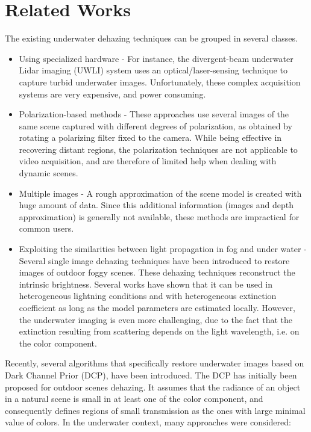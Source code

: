 \documentclass[hidelinks, 12pt]{report}
\begin{document}
\section{Related Works}
\justify
The existing underwater dehazing techniques can be grouped in several classes. 
\begin{itemize}
\item{Using specialized hardware - For instance, the divergent-beam underwater Lidar imaging (UWLI) system uses an optical/laser-sensing technique to capture turbid underwater images. Unfortunately, these complex acquisition systems are very expensive, and power consuming.}
\item{Polarization-based methods - These approaches use several images of the same scene captured with different degrees of polarization, as obtained by rotating a polarizing filter fixed to the camera. While being effective in recovering distant regions, the polarization techniques are not applicable to video acquisition, and are therefore of limited help when dealing with dynamic scenes.}
\item{Multiple images - A rough approximation of the scene model is created with huge amount of data. Since this additional information (images and depth approximation) is generally not available, these methods are impractical for common users.}
\item{Exploiting the similarities between light propagation in fog and under water - Several single image dehazing techniques have been introduced to restore images of outdoor foggy scenes. These dehazing techniques reconstruct the intrinsic brightness. Several works have shown that it can be used in heterogeneous lightning conditions and with heterogeneous extinction coefficient as long as the model parameters are estimated locally. However, the underwater imaging is even more challenging, due to the fact that the extinction resulting from scattering depends on the light wavelength, i.e. on the color component.}
\end{itemize}
Recently, several algorithms that specifically restore underwater images based on Dark Channel Prior (DCP), have been introduced. The DCP has initially been proposed for outdoor scenes dehazing. It assumes that the radiance of an object in a natural scene is small in at least one of the color component, and consequently defines regions of small transmission as the ones with large minimal value of colors. In the underwater context, many approaches were considered:
\end{document}
